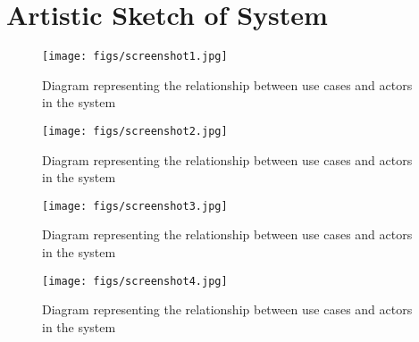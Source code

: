 
\section{Artistic Sketch of System}
\label{sec:artistic_sketch}


 

\begin{figure}
 \centering
  \texttt{[image: figs/screenshot1.jpg]}
	\caption{Diagram representing the relationship between use cases and actors in the system}
 \label{fig:use-cases}
\end{figure}

\begin{figure}
 \centering
  \texttt{[image: figs/screenshot2.jpg]}
	\caption{Diagram representing the relationship between use cases and actors in the system}
 \label{fig:use-cases}
\end{figure}

\begin{figure}
 \centering
  \texttt{[image: figs/screenshot3.jpg]}
	\caption{Diagram representing the relationship between use cases and actors in the system}
 \label{fig:use-cases}
\end{figure}

\begin{figure}
 \centering
  \texttt{[image: figs/screenshot4.jpg]}
	\caption{Diagram representing the relationship between use cases and actors in the system}
 \label{fig:use-cases}
\end{figure}
